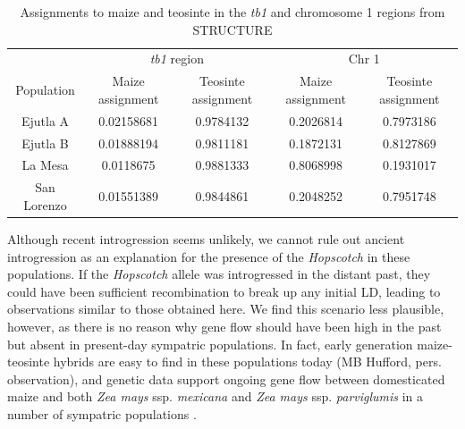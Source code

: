 \documentclass[11pt]{article}
\begin{document}
\begin{linenumbers}
\begin{flushleft}
\begin{table}[htbp]
  \centering
  \caption{Assignments to maize and teosinte in the \emph{tb1} and chromosome 1 regions from STRUCTURE}
    \begin{tabular}{ccccc}
          & \multicolumn{2}{c}{\emph{tb1} region} & \multicolumn{2}{c}{Chr 1} \\
    Population & Maize assignment & Teosinte assignment & Maize assignment & Teosinte assignment \\
    Ejutla A & 0.02158681 & 0.9784132 & 0.2026814 & 0.7973186 \\
    Ejutla B & 0.01888194 & 0.9811181 & 0.1872131 & 0.8127869 \\
    La Mesa & 0.0118675 & 0.9881333 & 0.8068998 & 0.1931017 \\
    San Lorenzo & 0.01551389 & 0.9844861 & 0.2048252 & 0.7951748 \\
    \end{tabular}
  \label{Table4Q}
\end{table}

Although recent introgression seems unlikely, we cannot rule out ancient introgression as an explanation for the presence of the \emph{Hopscotch} in these populations. If the \emph{Hopscotch} allele was introgressed in the distant past, they could have been sufficient recombination to break up any initial LD, leading to observations similar to those obtained here.  We find this scenario less plausible, however, as there is no reason why gene flow should have been high in the past but absent in present-day sympatric populations.  In fact, early generation maize-teosinte hybrids are easy to find in these populations today (MB Hufford, pers. observation), and genetic data support ongoing gene flow between domesticated maize and both \emph{Zea mays} ssp. \emph{mexicana} and \emph{Zea mays} ssp. \emph{parviglumis} in a number of sympatric populations \citep{Hufford2013, Ellstrand2007, vanHeerwaarden2011}. 


\end{flushleft}
\end{linenumbers}
\end{document}

